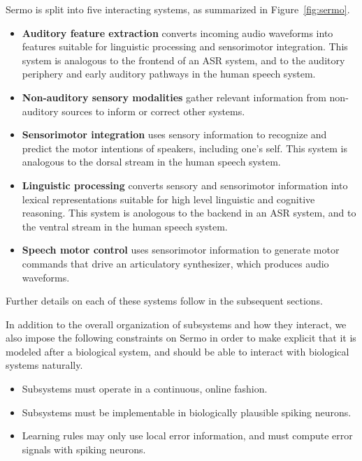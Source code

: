 Sermo is split into five interacting systems,
as summarized in Figure~\ref{fig:sermo}.
\begin{itemize}
  \item \textbf{Auditory feature extraction}
    converts incoming audio waveforms into
    features suitable for linguistic processing
    and sensorimotor integration.
    This system is analogous to the frontend
    of an ASR system,
    and to the auditory periphery and
    early auditory pathways in the human speech system.
  \item \textbf{Non-auditory sensory modalities}
    gather relevant information
    from non-auditory sources
    to inform or correct other systems.
  \item \textbf{Sensorimotor integration}
    uses sensory information to
    recognize and predict the motor intentions
    of speakers, including one's self.
    This system is analogous to the
    dorsal stream in the human speech system.
  \item \textbf{Linguistic processing}
    converts sensory and sensorimotor information
    into lexical representations
    suitable for high level linguistic
    and cognitive reasoning.
    This system is anologous to
    the backend in an ASR system,
    and to the ventral stream
    in the human speech system.
  \item \textbf{Speech motor control}
    uses sensorimotor information
    to generate motor commands
    that drive an articulatory synthesizer,
    which produces audio waveforms.
\end{itemize}

Further details on each of these
systems follow in the subsequent sections.

In addition to the overall organization
of subsystems and how they interact,
we also impose the following constraints
on Sermo in order to make explicit
that it is modeled after a biological system,
and should be able to interact
with biological systems naturally.

\begin{itemize}
  \item Subsystems must operate in a continuous, online fashion.
  \item Subsystems must be implementable in biologically plausible
    spiking neurons.
  \item Learning rules may only use local error information,
    and must compute error signals with spiking neurons.
\end{itemize}

